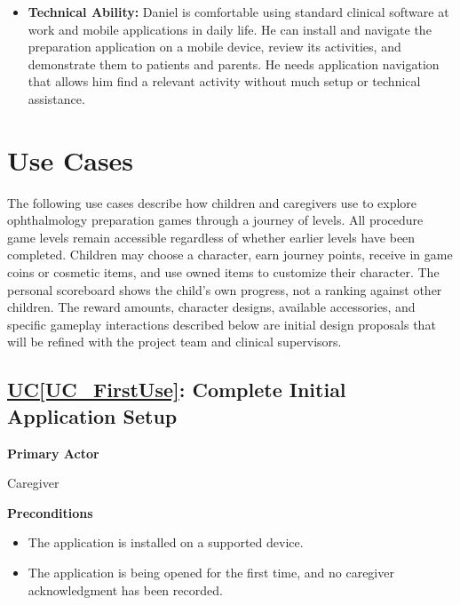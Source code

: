 \documentclass[12pt]{article}
\newcounter{ucnum} %
\newcommand{\ucref}[1]{\hyperref[#1]{UC\ref*{#1}}}
\begin{document}
\begin{itemize}
\item \textbf{Technical Ability:} Daniel is comfortable using standard
clinical software at work and mobile applications in daily life. He can 
install and navigate the preparation application on a mobile device, review its activities,
and demonstrate them to patients and parents. He needs application navigation that allows him find a relevant activity without much
setup or technical assistance.
\end{itemize}

\section{Use Cases}
\label{sec_UseCases}

The following use cases describe how children and caregivers use
\progname{} to explore ophthalmology preparation games through a
journey of levels. All procedure game levels remain accessible regardless
of whether earlier levels have been completed. Children may choose a
character, earn journey points, receive in game coins or cosmetic items,
and use owned items to customize their character. The personal scoreboard
shows the child's own progress, not a ranking against other children.
The reward amounts, character designs, available accessories, and specific
gameplay interactions described below are initial design proposals that
will be refined with the project team and clinical supervisors.

\label{UC_FirstUse}
\subsection{\ucref{UC_FirstUse}: Complete Initial Application Setup}

\textbf{Primary Actor}

Caregiver

\textbf{Preconditions}
\begin{itemize}
    \item The application is installed on a supported device.
    \item The application is being opened for the first time, and no
    caregiver acknowledgment has been recorded.
\end{itemize}
\end{document}
